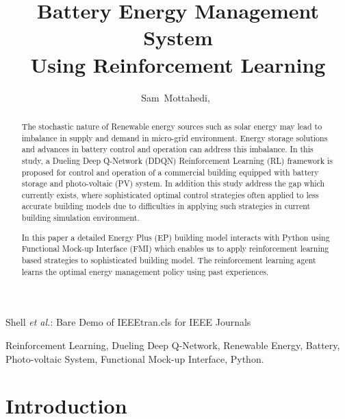 \documentclass[journal]{IEEEtran}
\begin{document}
\title{Battery Energy Management System \\ Using Reinforcement Learning}

\author{Sam~Mottahedi,~}


%
{Shell \MakeLowercase{\textit{et al.}}: Bare Demo of IEEEtran.cls for IEEE Journals}

\maketitle


\begin{abstract}
The stochastic nature of Renewable energy sources such as solar energy may lead to
imbalance in supply and demand in micro-grid environment. Energy storage solutions
and advances in battery control and operation can address this imbalance. In this
study, a Dueling Deep Q-Network (DDQN) Reinforcement Learning (RL) framework is
proposed for control and operation of a commercial building equipped with battery
storage and photo-voltaic (PV) system. In addition this study address the gap
which currently exists, where sophisticated optimal control strategies often
applied to less accurate building models due to difficulties in applying such
strategies in current building simulation environment.

In this paper a detailed Energy Plus (EP) building model interacts with Python using
Functional Mock-up Interface (FMI) which enables us to apply reinforcement learning
based strategies to sophisticated building model. The reinforcement
learning agent learns the optimal energy management policy using past experiences.
\end{abstract}

\begin{IEEEkeywords}
Reinforcement Learning, Dueling Deep Q-Network, Renewable Energy, Battery,
Photo-voltaic System, Functional Mock-up Interface, Python.
\end{IEEEkeywords}

\IEEEpeerreviewmaketitle



\section{Introduction}
\end{document}
